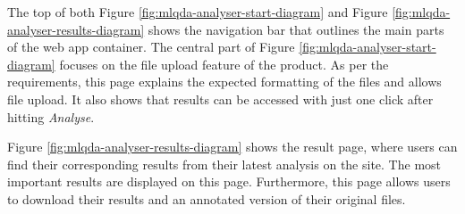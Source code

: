 \documentclass{l4proj}
\begin{document}
The top of both Figure \ref{fig:mlqda-analyser-start-diagram} and Figure \ref{fig:mlqda-analyser-results-diagram} shows the navigation bar that outlines the main parts of the web app container. The central part of Figure \ref{fig:mlqda-analyser-start-diagram} focuses on the file upload feature of the product. As per the requirements, this page explains the expected formatting of the files and allows file upload. It also shows that results can be accessed with just one click after hitting \textit{Analyse}. 

Figure \ref{fig:mlqda-analyser-results-diagram} shows the result page, where users can find their corresponding results from their latest analysis on the site. The most important results are displayed on this page. Furthermore, this page allows users to download their results and an annotated version of their original files.  
\end{document}
